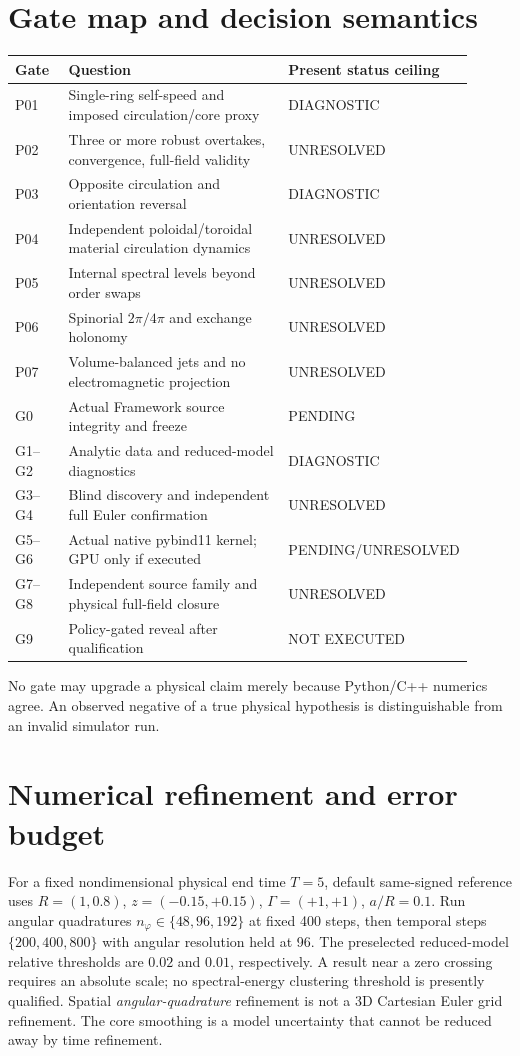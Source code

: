 \documentclass[10pt,a4paper]{article}
\begin{document}
\section{Gate map and decision semantics}
\small\begin{longtable}{p{0.12\linewidth}p{0.54\linewidth}p{0.25\linewidth}}\toprule Gate & Question & Present status ceiling\\\midrule\endhead
P01 & Single-ring self-speed and imposed circulation/core proxy & DIAGNOSTIC\\
P02 & Three or more robust overtakes, convergence, full-field validity & UNRESOLVED\\
P03 & Opposite circulation and orientation reversal & DIAGNOSTIC\\
P04 & Independent poloidal/toroidal material circulation dynamics & UNRESOLVED\\
P05 & Internal spectral levels beyond order swaps & UNRESOLVED\\
P06 & Spinorial $2\pi/4\pi$ and exchange holonomy & UNRESOLVED\\
P07 & Volume-balanced jets and no electromagnetic projection & UNRESOLVED\\
G0 & Actual Framework source integrity and freeze & PENDING\\
G1--G2 & Analytic data and reduced-model diagnostics & DIAGNOSTIC\\
G3--G4 & Blind discovery and independent full Euler confirmation & UNRESOLVED\\
G5--G6 & Actual native pybind11 kernel; GPU only if executed & PENDING/UNRESOLVED\\
G7--G8 & Independent source family and physical full-field closure & UNRESOLVED\\
G9 & Policy-gated reveal after qualification & NOT EXECUTED\\\bottomrule\end{longtable}\normalsize
No gate may upgrade a physical claim merely because Python/C++ numerics agree. An observed negative of a true physical hypothesis is distinguishable from an invalid simulator run.

\section{Numerical refinement and error budget}
For a fixed nondimensional physical end time $T=5$, default same-signed reference uses $R=(1,0.8)$, $z=(-0.15,+0.15)$, $\Gamma=(+1,+1)$, $a/R=0.1$. Run angular quadratures $n_\varphi\in\{48,96,192\}$ at fixed 400 steps, then temporal steps $\{200,400,800\}$ with angular resolution held at 96. The preselected reduced-model relative thresholds are $0.02$ and $0.01$, respectively. A result near a zero crossing requires an absolute scale; no spectral-energy clustering threshold is presently qualified. Spatial \emph{angular-quadrature} refinement is not a 3D Cartesian Euler grid refinement. The core smoothing is a model uncertainty that cannot be reduced away by time refinement.
\end{document}
